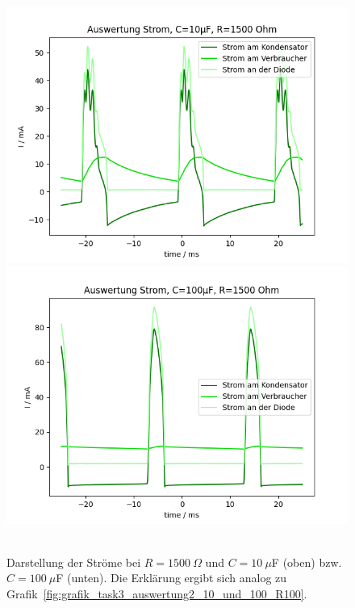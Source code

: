 \documentclass{article}
\begin{document}
\begin{figure}[H]
\caption{Darstellung der Ströme bei $R=1500~\Omega$ und $C=10~\mu$F (oben) bzw. $C=100~\mu$F (unten). Die Erklärung ergibt sich analog zu Grafik~\ref{fig:grafik_task3_auswertung2_10_und_100_R100}.}
\label{fig:grafik_task3_auswertung2_10_und_100_R1500}
{\centering
\includegraphics[scale=0.6]{bilder/task3_auswertung2_10mu_R1500.png}
\includegraphics[scale=0.6]{bilder/task3_auswertung2_100mu_R1500.png}
~
}
\end{figure}
\end{document}
